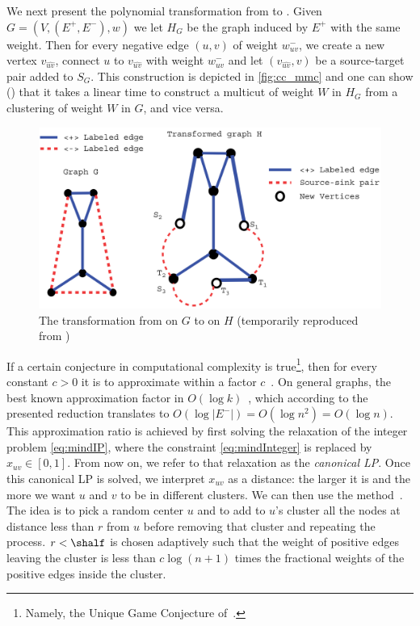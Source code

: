 We next present the polynomial transformation from \pcc{} to \mmc{}. Given $G=(V, (E^+, E^-), w)$ we let
$H_G$ be the graph induced by $E^+$ with the same weight. Then for every negative edge $(u,v)$ of
weight $w_{uv}^-$, we create a new vertex $v_{\widehat{uv}}$, connect $u$ to $v_{\widehat{uv}}$ with
weight $w_{uv}^-$ and let $(v_{\widehat{uv}}, v)$ be a source-target pair added to $S_G$. This
construction is depicted in \autoref{fig:cc_mmc} and one can show (\autocite[Theorem
4.4]{Demaine2006}) that it takes a linear time to construct a
multicut of weight $W$ in $H_G$ from a clustering of weight $W$ in $G$, and vice versa.

\begin{figure}[htpb]
   \centering
   \includegraphics[width=0.8\linewidth]{assets/raw/cc_to_mmc.png}
   \caption{The transformation from \pcc{} on $G$ to \mmc{} on $H$ (temporarily reproduced from
   \autocite{Demaine2006}) \label{fig:cc_mmc}}
\end{figure}

If a certain conjecture in computational complexity is true\footnote{Namely, the Unique Game
Conjecture of~\textcite{UGC02}.}, then for every constant $c>0$ it is \NPh{} to approximate \mmc{}
within a factor $c$~\autocite{}. On general graphs, the best known approximation factor in $O(\log
k)$~\autocite{RegionGrowing93}, which according to the presented reduction translates to
$O(\log|E^-|)=O(\log n^2)=O(\log n)$. This approximation ratio is achieved by first solving the
relaxation of the integer problem \eqref{eq:mindIP}, where the constraint \eqref{eq:mindInteger} is
replaced by $x_{uv}\in [0,1]$. From now on, we refer to that relaxation as the \emph{canonical
\mind{} LP}. Once this canonical \mind{} LP is solved, we interpret $x_{uv}$ as a distance: the
larger it is and the more we want $u$ and $v$ to be in different clusters. We can then use the
\regionGrow{} method~\autocite{RegionGrowing93}. The idea is to pick a random center $u$ and to add
to $u$'s cluster all the nodes at distance less than $r$ from $u$ before removing that cluster and
repeating the process. $r<\shalf$ is chosen adaptively such that the weight of positive edges
leaving the cluster is less than $c\log(n+1)$ times the fractional weights of the positive edges
inside the cluster.

